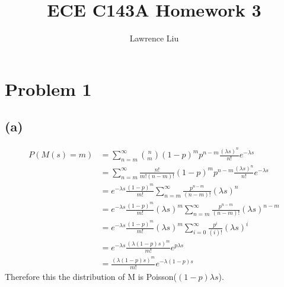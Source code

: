 \documentclass[12pt]{article}
\title{ECE C143A Homework 3}
\author{Lawrence Liu}
\begin{document}
\maketitle
\section*{Problem 1}
\subsection*{(a)}
\begin{align*}
    P(M(s)=m)&=\sum_{n=m}^{\infty}\binom{n}{m}(1-p)^mp^{n-m}\frac{(\lambda s)^n}{n!}e^{-\lambda s}\\
            &=\sum_{n=m}^{\infty}\frac{n!}{m!(n-m)!}(1-p)^mp^{n-m}\frac{(\lambda s)^n}{n!}e^{-\lambda s}\\
            &=e^{-\lambda s}\frac{(1-p)^m}{m!}\sum_{n=m}^{\infty}\frac{p^{n-m}}{(n-m)!}(\lambda s)^n\\
            &=e^{-\lambda s}\frac{(1-p)^m}{m!}(\lambda s)^{m}\sum_{n=m}^{\infty}\frac{p^{n-m}}{(n-m)!}(\lambda s)^{n-m}\\
            &=e^{-\lambda s}\frac{(1-p)^m}{m!}(\lambda s)^{m}\sum_{i=0}^{\infty}\frac{p^{i}}{(i)!}(\lambda s)^{i}\\
            &=e^{-\lambda s}\frac{(\lambda(1-p)s)^m}{m!}e^{p\lambda s}\\
            &=\frac{(\lambda(1-p)s)^m}{m!}e^{-\lambda(1-p)s}
\end{align*}
Therefore this the distribution of M is Poisson($(1-p)\lambda s$).
\end{document}
